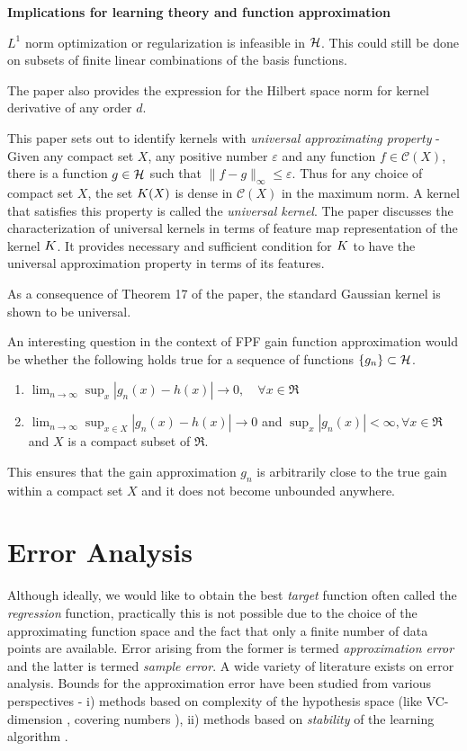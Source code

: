 \textbf{Implications for learning theory and function approximation}

$L^1$ norm optimization or regularization is infeasible in ${\cal H}$. This could still be done on subsets of finite linear combinations of the basis functions.

The paper also provides the expression for the Hilbert space norm for kernel derivative of any order $d$. 

\cite{micchaxuzha06}
This paper sets out to identify kernels with \textit{universal approximating property} - Given any compact set $X$,  any positive number $\varepsilon$ and any function $f \in \mathcal{C}(X)$, there is a function $g \in {\cal H}$ such that $\| f - g\|_{\infty} \leq \varepsilon$. Thus for any choice of compact set $X$, the set $K(X)$ is dense in $\mathcal{C}(X)$ in the maximum norm. A kernel that satisfies this property is called the \textit{universal kernel}. The paper discusses the characterization of universal kernels in terms of feature map representation of the kernel $K$. It provides necessary and sufficient condition for $K$ to have the universal approximation property in terms of its features. 

As a consequence of Theorem 17 of the paper, the standard Gaussian kernel is shown to be universal. 


An interesting question in the context of FPF gain function approximation would be whether the following holds true for a sequence of functions $\{g_n\} \subset {\cal H}$.
\begin{enumerate}
\item $\lim_{n \to \infty} \sup_x |g_n(x) -h(x) | \to 0,\quad \forall x \in \Re$
\item $ \lim_{n \to \infty}\sup_{x \in X} |g_n(x) - h(x) | \to 0$ and $\sup_x |g_n(x)| < \infty,  \forall x \in \Re$ and $X$ is a compact subset of $\Re$. 
\end{enumerate}
This ensures that the gain approximation $g_n$ is arbitrarily close to the true gain within a compact set $X$ and it does not become unbounded anywhere. 


\section{Error Analysis}
\label{s:erm_error}
Although ideally, we would like to obtain the best \textit{target} function often called the \textit{regression} function, practically this is not possible due to the choice of the approximating function space and the fact that only a finite number of data points are available. Error arising from the former is termed \textit{approximation error} and the latter is termed \textit{sample error}. A wide variety of literature exists on error analysis. Bounds for the approximation error have been studied from various perspectives - i) methods based on complexity of the hypothesis space (like VC-dimension \cite{gir95}, covering numbers \cite{zhou02, smazhou03, zhou03}), ii) methods based on \textit{stability} of the learning algorithm \cite{boueli01,boueli02}.

